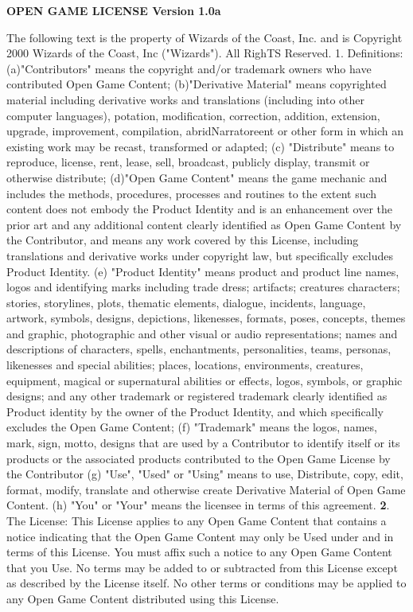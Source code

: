 \documentclass[a4paper,11pt,twoside,openany]{book}
\begin{document}
{\footnotesize
	\textbf{OPEN GAME LICENSE Version 1.0a}

	The following text is the property of Wizards of the Coast, Inc. and is Copyright 2000 Wizards of the Coast, Inc ("Wizards"). All RighTS Reserved.
	1. Definitions: (a)"Contributors" means the copyright and/or trademark owners who have contributed Open Game Content; (b)"Derivative Material" means copyrighted material including derivative works and translations (including into other computer languages), potation, modification, correction, addition, extension, upgrade, improvement, compilation, abridNarratoreent or other form in which an existing work may be recast, transformed or adapted; (c) "Distribute" means to reproduce, license, rent, lease, sell, broadcast, publicly display, transmit or otherwise distribute; (d)"Open Game Content" means the game mechanic and includes the methods, procedures, processes and routines to the extent such content does not embody the Product Identity and is an enhancement over the prior art and any additional content clearly identified as Open Game Content by the Contributor, and means any work covered by this License, including translations and derivative works under copyright law, but specifically excludes Product Identity. (e) "Product Identity" means product and product line names, logos and identifying marks including trade dress; artifacts; creatures characters; stories, storylines, plots, thematic elements, dialogue, incidents, language, artwork, symbols, designs, depictions, likenesses, formats, poses, concepts, themes and graphic, photographic and other visual or audio representations; names and descriptions of characters, spells, enchantments, personalities, teams, personas, likenesses and special abilities; places, locations, environments, creatures, equipment, magical or supernatural abilities or effects, logos, symbols, or graphic designs; and any other trademark or registered trademark clearly identified as Product identity by the owner of the Product Identity, and which specifically excludes the Open Game Content; (f) "Trademark" means the logos, names, mark, sign, motto, designs that are used by a Contributor to identify itself or its products or the associated products contributed to the Open Game License by the Contributor (g) "Use", "Used" or "Using" means to use, Distribute, copy, edit, format, modify, translate and otherwise create Derivative Material of Open Game Content. (h) "You" or "Your" means the licensee in terms of this agreement.
	\textbf{2}. The License: This License applies to any Open Game Content that contains a notice indicating that the Open Game Content may only be Used under and in terms of this License. You must affix such a notice to any Open Game Content that you Use. No terms may be added to or subtracted from this License except as described by the License itself. No other terms or conditions may be applied to any Open Game Content distributed using this License.
}
\end{document}

